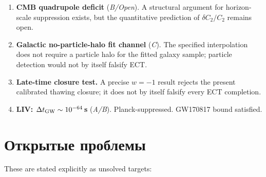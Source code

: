\documentclass[11pt,a4paper]{article}
\begin{document}
\begin{enumerate}
\item \textbf{CMB quadrupole deficit} (\emph{B/Open}). A structural argument for horizon-scale suppression exists, but the quantitative prediction of $\delta C_2/C_2$ remains open.

\item \textbf{Galactic no-particle-halo fit channel} (\emph{C}). The specified interpolation does not require a particle halo for the fitted galaxy sample; particle detection would not by itself falsify ECT.

\item \textbf{Late-time closure test.} A precise $w=-1$ result rejects the present calibrated thawing closure; it does not by itself falsify every ECT completion.

\item \textbf{LIV: $\Delta t_{\rm GW} \sim 10^{-64}$\,s} (\emph{A/B}). Planck-suppressed. GW170817 bound satisfied.
\end{enumerate}

\section{Открытые проблемы}

These are stated explicitly as unsolved targets:
\end{document}
